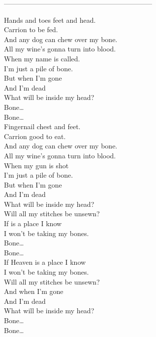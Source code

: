 -----------------------------------------------------------------



Hands and toes feet and head. \\
Carrion to be fed. \\
And any dog can chew over my bone. \\
All my wine's gonna turn into blood. \\
When my name is called. \\
I'm just a pile of bone. \\

But when I'm gone \\
And I'm dead \\
What will be inside my head? \\

Bone… \\
Bone… \\

Fingernail chest and feet. \\
Carrion good to eat. \\
And any dog can chew over my bone. \\
All my wine's gonna turn into blood. \\
When my gun is shot \\
I'm just a pile of bone. \\

But when I'm gone \\
And I'm dead \\
What will be inside my head? \\
Will all my stitches be unsewn? \\
If  is a place I know \\
I won't be taking my bones. \\

Bone… \\
Bone… \\

If Heaven is a place I know \\
I won't be taking my bones. \\
Will all my stitches be unsewn? \\
And when I'm gone \\
And I'm dead \\
What will be inside my head? \\

Bone… \\
Bone… \\

